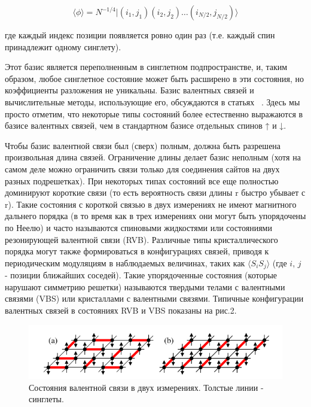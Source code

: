 \documentclass[11pt]{article}
\begin{document}
\begin{equation}
\langle \phi \rangle = N^{-1/4}| (i_1,j_1)(i_2,j_2) \dots (i_{N/2}, j_{N/2}) \rangle
\label{eq_20}
\end{equation}

где каждый индекс позиции появляется ровно один раз (т.е. каждый спин принадлежит одному синглету).

Этот базис является переполненным в синглетном подпространстве, и, таким образом, любое синглетное состояние может быть расширено в эти состояния, но коэффициенты разложения не уникальны. Базис валентных связей и вычислительные методы, использующие его, обсуждаются в статьях ~\cite{prl_95_207203,npb_750,arXiv_0704_1469,prb_82_024407}. Здесь мы просто отметим, что некоторые типы состояний более естественно выражаются в базисе валентных связей, чем в стандартном базисе отдельных спинов ↑ и ↓.

Чтобы базис валентной связи был (сверх) полным, должна быть разрешена произвольная длина связей. Ограничение длины делает базис неполным (хотя на самом деле можно ограничить связи только для соединения сайтов на двух разных подрешетках). При некоторых типах состояний все еще полностью доминируют короткие связи (то есть вероятность связи длины r быстро убывает с r). Такие состояния с короткой связью в двух измерениях не имеют магнитного дальнего порядка (в то время как в трех измерениях они могут быть упорядочены по Неелю) и часто называются спиновыми жидкостями или состояниями резонирующей валентной связи (RVB). Различные типы кристаллического порядка могут также формироваться в конфигурациях связей, приводя к периодическим модуляциям в наблюдаемых величинах, таких как $\langle S_i S_j \rangle$ (где $i$, $j$ - позиции ближайших соседей). Такие упорядоченные состояния (которые нарушают симметрию решетки) называются твердыми телами с валентными связями (VBS) или кристаллами с валентными связями. Типичные конфигурации валентных связей в состояниях RVB и VBS показаны на рис.2.

\begin{figure}[htp]
\centering
\includegraphics[scale=0.5]{fig2}
\caption{Состояния валентной связи в двух измерениях. Толстые линии - синглеты.}
\label{}
\end{figure}
\end{document}
